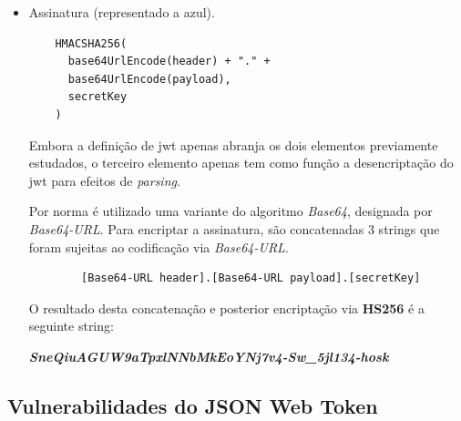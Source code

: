 \begin{itemize}
    Os atributos designados por \emph{name} e \emph{numAluno} são designado por atributos não registados, podendo conter qualquer tipo de informação representável sobre a forma de string.
    
    No âmbito do projeto \gls{clav} são utilizados outros atributos registados, sendo o de maior importância o atributo \emph{exp}, cuja função é representar uma data específica, seguindo o formato \emph{"seconds since epoch"}\footnote{Definido pela \gls{posix} em \url{http://pubs.opengroup.org/onlinepubs/9699919799/basedefs/V1_chap04.html##tag_04_15}}, após a qual o \gls{jwt} é considerado inválido.
    
    A informação acima representada anteriormente é transcrita sobre a forma da seguinte string:
    
    \begin{center}
        \textbf{\emph{eyJzdWIiOiIxMjM0NTY3ODkwIiwibmFtZSI6Ik\\9jdMOhdmlvIE1haWEiLCJudW1BbHVubyI6NzEzNjl9}}
    \end{center}
    
    \newpage
    \item Assinatura (representado a azul).
    \begin{verbatim}
    HMACSHA256(
      base64UrlEncode(header) + "." +
      base64UrlEncode(payload),
      secretKey  
    )
    \end{verbatim}
    
    Embora a definição de \gls{jwt} apenas abranja os dois elementos previamente estudados, o terceiro elemento apenas tem como função a desencriptação do \gls{jwt} para efeitos de \emph{parsing}.
    
    Por norma é utilizado uma variante do algoritmo \emph{Base64}, designada por \emph{Base64-URL}. Para encriptar a assinatura, são concatenadas 3 strings que foram sujeitas ao codificação via \emph{Base64-URL}.
    
    \begin{verbatim}
        [Base64-URL header].[Base64-URL payload].[secretKey]
    \end{verbatim}
    
    O resultado desta concatenação e posterior encriptação via \textbf{HS256} é a seguinte string:
    
    \begin{center}
        \textbf{\emph{SneQiuAGUW9aTpxlNNbMkEoYNj7v4-Sw\_5jl134-hosk}}
    \end{center}
\end{itemize}

\cleardoublepage
\subsection{Vulnerabilidades do JSON Web Token}